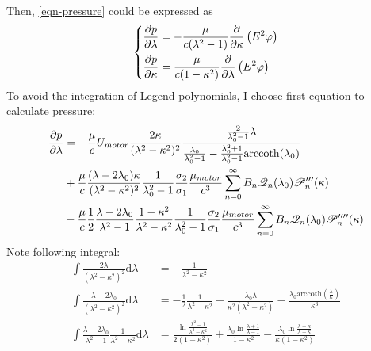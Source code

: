 \documentclass[fontsize=11pt, %
                             paper=a4, %
                             twoside, %
                             captions=tableheading,
                             index=totoc,
                             hyperref]{labbook}
\begin{document}
\begin{addmargin}[4cm]{0cm}
\begin{equation}
\begin{aligned}
\end{aligned}
\end{equation}
Then, \ref{eqn-pressure} could be expressed as
\begin{equation}
\left\{
\begin{aligned}
\frac{\partial p}{\partial \lambda}&=-\frac{\mu}{c(\lambda^2-1)}\frac{\partial }{\partial \kappa}\left(E^2 \varphi\right)\\
\frac{\partial p}{\partial \kappa}&=\frac{\mu}{c(1-\kappa^2)}\frac{\partial }{\partial \lambda}\left(E^2 \varphi\right)
\end{aligned}
\right.
\end{equation}
To avoid the integration of Legend polynomials, I choose first equation to calculate pressure:
\begin{equation}
\begin{aligned}
\frac{\partial p}{\partial \lambda}&=-\frac{\mu}{c}U_{motor}\frac{2\kappa}{(\lambda^2-\kappa^2)^2}\frac{\frac{2}{\lambda_0^2-1}\lambda}{\frac{\lambda_0}{\lambda_0^2-1}-\frac{\lambda_0^2+1}{\lambda_0^2-1}\mathrm{arccoth}(\lambda_0)}\\
&+\frac{\mu}{c}\frac{(\lambda-2\lambda_0)\kappa}{(\lambda^2-\kappa^2)^2}\frac{1}{\lambda_0^2-1}\frac{\sigma_2}{\sigma_1}\frac{\mu_{motor}}{c^3}\sum_{n=0}^\infty B_n \mathscr{Q}_n(\lambda_0)\mathscr{P}_n^{\prime\prime\prime}(\kappa)\\
&-\frac{\mu}{c}\frac{1}{2}\frac{\lambda-2\lambda_0}{\lambda^2-1}\frac{1-\kappa^2}{\lambda^2-\kappa^2}\frac{1}{\lambda_0^2-1}\frac{\sigma_2}{\sigma_1}\frac{\mu_{motor}}{c^3}\sum_{n=0}^\infty B_n \mathscr{Q}_n(\lambda_0)\mathscr{P}_n^{\prime\prime\prime\prime}(\kappa)
\end{aligned}
\end{equation}
Note following integral:
\begin{equation}
\begin{aligned}
\int\frac{2\lambda}{(\lambda^2-\kappa^2)^2}\mathrm{d}\lambda&=-\frac{1}{\lambda^2-\kappa^2}\\
\int\frac{\lambda-2\lambda_0}{(\lambda^2-\kappa^2)^2}\mathrm{d}\lambda&=-\frac{1}{2}\frac{1}{\lambda^2-\kappa^2}+\frac{\lambda_0\lambda}{\kappa^2(\lambda^2-\kappa^2)}-\frac{\lambda_0\mathrm{arccoth}(\frac{\lambda}{\kappa})}{\kappa^3}\\
\int\frac{\lambda-2\lambda_0}{\lambda^2-1}\frac{1}{\lambda^2-\kappa^2}\mathrm{d}\lambda&=
\frac{\ln\frac{\lambda^2-1}{\lambda^2-\kappa^2}}{2(1-\kappa^2)}+\frac{\lambda_0\ln\frac{\lambda+1}{\lambda-1}}{1-\kappa^2}-\frac{\lambda_0\ln\frac{\lambda+\kappa}{\lambda -\kappa}}{\kappa(1-\kappa^2)}
\end{aligned}

\end{equation}
\end{addmargin}
\end{document}

